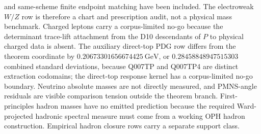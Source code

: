 \documentclass[11pt]{article}
\begin{document}
and same-scheme finite endpoint matching have been included.
The electroweak \(W/Z\) row is therefore a chart and prescription audit, not a physical mass
benchmark. Charged leptons carry a corpus-limited
no-go because the determinant trace-lift attachment from the D10 descendants of \(P\) to physical charged data is absent. The auxiliary
direct-top PDG row differs from the theorem coordinate by \(0.20673301656674425~\mathrm{GeV}\),
or \(0.28458848947515303\) combined standard deviations, because Q007TP and Q007TP4 are distinct
extraction codomains; the direct-top response kernel has a corpus-limited no-go boundary. Neutrino absolute masses are
not directly measured, and PMNS-angle residuals are visible comparison tension outside the
theorem branch. First-principles hadron masses have no emitted prediction because the
required Ward-projected hadronic spectral measure must come from a working OPH
hadron construction. Empirical hadron closure rows carry a separate support class.
\end{document}
